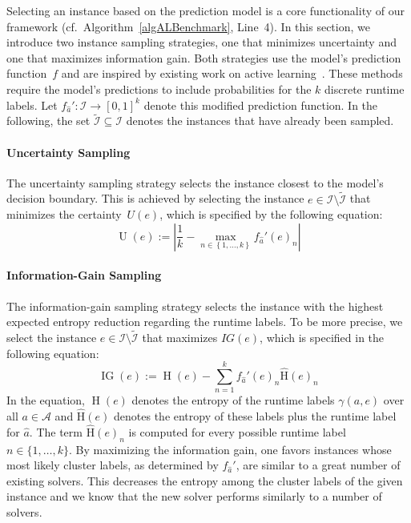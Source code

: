 \documentclass[sn-basic, Numbered]{sn-jnl} %
\begin{document}
Selecting an instance based on the prediction model is a core functionality of our framework (cf.~Algorithm~\ref{algALBenchmark}, Line~4).
In this section, we introduce two instance sampling strategies, one that minimizes uncertainty and one that maximizes information gain.
Both strategies use the model's prediction function~$f$ and are inspired by existing work on active learning~\cite{settles2009active}.
These methods require the model's predictions to include probabilities for the $k$ discrete runtime labels.
Let $f_{\hat a}' : \mathcal{I} \rightarrow \left[0, 1\right]^k$ denote this modified prediction function.
In the following, the set $\tilde{\mathcal{I}} \subseteq \mathcal{I}$ denotes the instances that have already been sampled.

\paragraph{Uncertainty Sampling}

The uncertainty sampling strategy selects the instance closest to the model's decision boundary.
This is achieved by selecting the instance $e \in \mathcal{I} \setminus \tilde{\mathcal{I}}$ that minimizes the certainty~$U(e)$, which is specified by the following equation:
%
\begin{equation*}
  \operatorname{U}(e) := \left\lvert \frac{1}{k} - \max_{n \in \left\lbrace 1, \dots, k \right\rbrace} f_{\hat{a}}'(e)_{n} \right\rvert
\end{equation*}

\paragraph{Information-Gain Sampling}

The information-gain sampling strategy selects the instance with the highest expected entropy reduction regarding the runtime labels.
To be more precise, we select the instance $e \in \mathcal{I} \setminus \tilde{\mathcal{I}}$ that maximizes $IG(e)$, which is specified in the following equation:
%
\begin{equation*}
  \operatorname{IG}(e) := \operatorname{H}(e) - \sum_{n = 1}^{k} f_{\hat{a}}'(e)_{n} \operatorname{\hat H}(e)_n
\end{equation*}
%
In the equation, $\operatorname{H}(e)$ denotes the entropy of the runtime labels $\gamma(a, e)$ over all $a \in \mathcal{A}$ and $\operatorname{\hat H}(e)$ denotes the entropy of these labels plus the runtime label for $\hat{a}$.
The term $\operatorname{\hat H}(e)_n$ is computed for every possible runtime label $n \in \{1, \dots, k\}$.
By maximizing the information gain, one favors instances whose most likely cluster labels, as determined by $f_{\hat a}'$, are similar to a great number of existing solvers.
This decreases the entropy among the cluster labels of the given instance and we know that the new solver performs similarly to a number of solvers.
\end{document}
